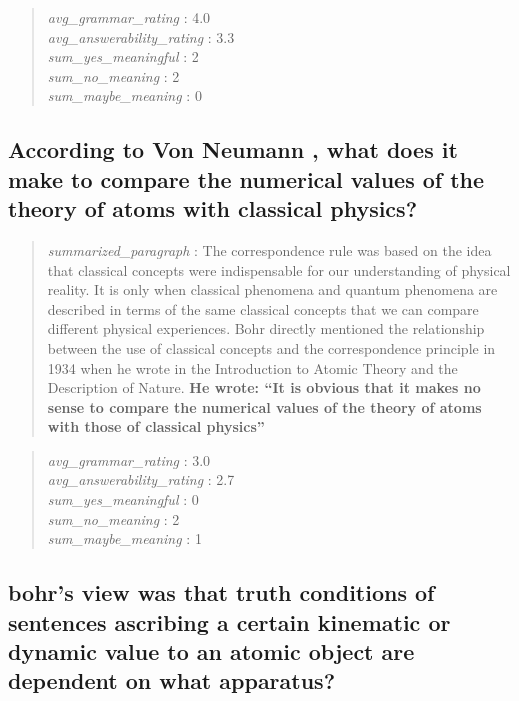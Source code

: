 \begin{quote}
\emph{avg\_grammar\_rating} : 4.0\\
\emph{avg\_answerability\_rating} : 3.3\\
\emph{sum\_yes\_meaningful} : 2\\
\emph{sum\_no\_meaning} : 2\\
\emph{sum\_maybe\_meaning} : 0
\end{quote}

\hypertarget{according-to-von-neumann-what-does-it-make-to-compare-the-numerical-values-of-the-theory-of-atoms-with-classical-physics}{%
\subsection{According to Von Neumann , what does it make to compare the
numerical values of the theory of atoms with classical
physics?}\label{according-to-von-neumann-what-does-it-make-to-compare-the-numerical-values-of-the-theory-of-atoms-with-classical-physics}}

\begin{quote}
\emph{summarized\_paragraph} : The correspondence rule was based on the
idea that classical concepts were indispensable for our understanding of
physical reality. It is only when classical phenomena and quantum
phenomena are described in terms of the same classical concepts that we
can compare different physical experiences. Bohr directly mentioned the
relationship between the use of classical concepts and the
correspondence principle in 1934 when he wrote in the Introduction to
Atomic Theory and the Description of Nature. \textbf{He wrote: ``It is
obvious that it makes no sense to compare the numerical values of the
theory of atoms with those of classical physics''}
\end{quote}

\begin{quote}
\emph{avg\_grammar\_rating} : 3.0\\
\emph{avg\_answerability\_rating} : 2.7\\
\emph{sum\_yes\_meaningful} : 0\\
\emph{sum\_no\_meaning} : 2\\
\emph{sum\_maybe\_meaning} : 1
\end{quote}

\hypertarget{bohrs-view-was-that-truth-conditions-of-sentences-ascribing-a-certain-kinematic-or-dynamic-value-to-an-atomic-object-are-dependent-on-what-apparatus}{%
\subsection{bohr's view was that truth conditions of sentences ascribing
a certain kinematic or dynamic value to an atomic object are dependent
on what
apparatus?}\label{bohrs-view-was-that-truth-conditions-of-sentences-ascribing-a-certain-kinematic-or-dynamic-value-to-an-atomic-object-are-dependent-on-what-apparatus}}

